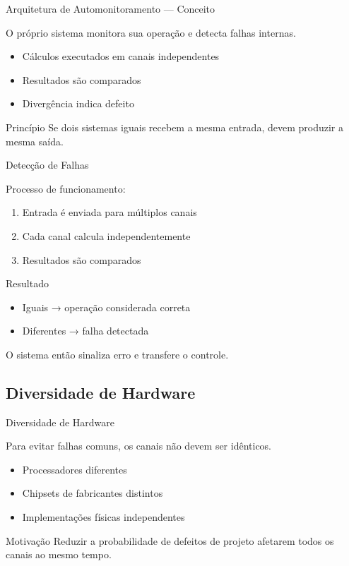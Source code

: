 \documentclass[9pt]{beamer}
\begin{document}
\begin{frame}{Arquitetura de Automonitoramento — Conceito}
\small

O próprio sistema monitora sua operação e detecta falhas internas.

\begin{itemize}
    \item Cálculos executados em canais independentes
    \item Resultados são comparados
    \item Divergência indica defeito
\end{itemize}

\begin{block}{Princípio}
Se dois sistemas iguais recebem a mesma entrada,
devem produzir a mesma saída.
\end{block}

\end{frame}
\begin{frame}{Detecção de Falhas}
\small

Processo de funcionamento:

\begin{enumerate}
    \item Entrada é enviada para múltiplos canais
    \item Cada canal calcula independentemente
    \item Resultados são comparados
\end{enumerate}

\begin{alertblock}{Resultado}
\begin{itemize}
    \item Iguais → operação considerada correta
    \item Diferentes → falha detectada
\end{itemize}
\end{alertblock}

O sistema então sinaliza erro e transfere o controle.

\end{frame}
\subsection{Diversidade de Hardware}

\begin{frame}{Diversidade de Hardware}
\small

Para evitar falhas comuns, os canais não devem ser idênticos.

\begin{itemize}
    \item Processadores diferentes
    \item Chipsets de fabricantes distintos
    \item Implementações físicas independentes
\end{itemize}

\begin{block}{Motivação}
Reduzir a probabilidade de defeitos de projeto afetarem todos os canais ao mesmo tempo.
\end{block}

\end{frame}
\end{document}
